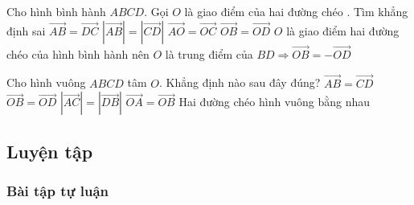 \begin{ex}%
	Cho hình bình hành $ABCD$. Gọi $O$ là giao điểm của hai đường chéo . Tìm khẳng định sai
	\choice
	{$\overrightarrow{AB}=\overrightarrow{DC}$}
	{$|\overrightarrow{AB}|=|\overrightarrow{CD}|$}
	{$\overrightarrow{AO}=\overrightarrow{OC}$}
	{\True $\overrightarrow{OB}=\overrightarrow{OD}$}
	\loigiai
	{$O$ là giao điểm hai đường chéo của hình bình hành nên $O$ là trung điểm của $BD \Rightarrow \overrightarrow{OB}=-\overrightarrow{OD}$}
\end{ex}


\begin{ex}%
	Cho hình vuông $ABCD$ tâm $O$. Khẳng định nào sau đây đúng?
	\choice
	{$\overrightarrow{AB}=\overrightarrow{CD}$}
	{$\overrightarrow{OB}=\overrightarrow{OD}$}
	{\True $|\overrightarrow{AC}|=|\overrightarrow{DB}|$}
	{$\overrightarrow{OA}=\overrightarrow{OB}$}
	\loigiai
	{Hai đường chéo hình vuông bằng nhau}
\end{ex}


\subsection{Luyện tập}
\subsubsection{Bài tập tự luận}

\setcounter{bt}{0}


